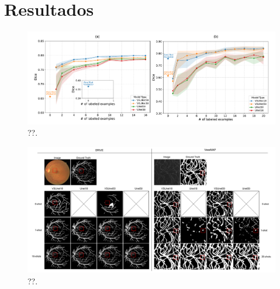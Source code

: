 \documentclass[%
reprint,
nofootinbib,
 amsmath,amssymb,
aps,
superscriptaddress,
showkeys,
longbibliography
]{revtex4-1}
\begin{document}
\begin{table}[t]
\begin{table}[t]
\section{Resultados}
\label{s:results}

\begin{figure}[tbp]
    \centering
    \includegraphics[width=\textwidth]{figures/results/results_charts.pdf}
    \caption{??.}
    \label{f:results_charts}
\end{figure}


\begin{figure}[tbp]
    \centering
    \includegraphics[width=\textwidth]{figures/results/results_fewshots.pdf}
    \caption{??.}
    \label{f:results_fewshots_drive}
\end{figure}





\end{table}
\end{table}
\end{document}
